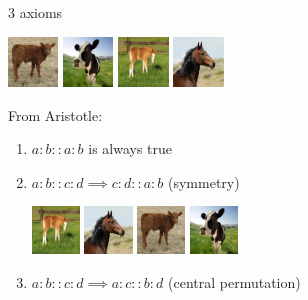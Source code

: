 \documentclass{beamer}
\begin{document}
\begin{frame}{3 axioms}
  \begin{center}
  \includegraphics[width=0.1\textwidth]{figures/calf.jpg}
  \includegraphics[width=0.1\textwidth]{figures/cow.jpg}
  \includegraphics[width=0.1\textwidth]{figures/foal.jpg}
  \includegraphics[width=0.1\textwidth]{figures/horse.jpg}
  \end{center}
  From Aristotle:
  \begin{enumerate}
    \item $a:b::a:b$ is always true
    \item $a:b::c:d \implies c:d::a:b$ (symmetry)
    \begin{center}
      \includegraphics[width=0.1\textwidth]{figures/foal.jpg}
      \includegraphics[width=0.1\textwidth]{figures/horse.jpg}
      \includegraphics[width=0.1\textwidth]{figures/calf.jpg}
      \includegraphics[width=0.1\textwidth]{figures/cow.jpg}
    \end{center}
    \item $a:b::c:d \implies a:c::b:d$ (central permutation)

\end{enumerate}
\end{frame}
\end{document}
